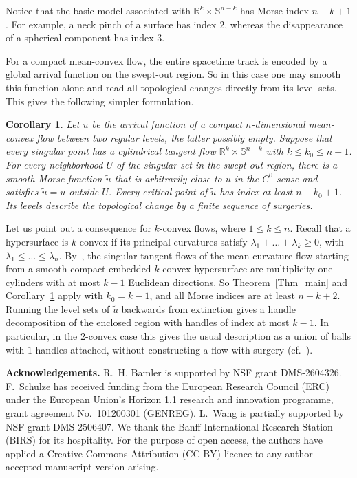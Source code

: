 \documentclass[10pt,a4paper]{amsart}
\newcommand{\IR}{\mathbb{R}}
\newcommand{\IS}{\mathbb{S}}
\newcommand{\la}{\lambda}
\newcommand{\td}[1]{\widetilde{#1}}
\newtheorem{Corollary}[equation]{Corollary}
\numberwithin{equation}{section}
\begin{document}
Notice that the basic model associated with $\IR^k\times\IS^{n-k}$ has Morse index $n-k+1$.
For example, a neck pinch of a surface has index $2$, whereas the disappearance of a spherical component has index $3$.

\medskip

For a compact mean-convex flow, the entire spacetime track is encoded by a global arrival function on the swept-out region.
So in this case one may smooth this function alone and read all topological changes directly from its level sets.
This gives the following simpler formulation.

\begin{Corollary}\label{Cor_mean_convex}
Let $u$ be the arrival function of a compact $n$-dimensional mean-convex flow between two regular levels, the latter possibly empty.
Suppose that every singular point has a cylindrical tangent flow $\IR^k\times\IS^{n-k}$ with $k\leq k_0\leq n-1$.
For every neighborhood $U$ of the singular set in the swept-out region, there is a smooth Morse function $\td u$ that is arbitrarily close to $u$ in the $C^0$-sense and satisfies $\td u=u$ outside $U$.
Every critical point of $\td u$ has index at least $n-k_0+1$.
Its levels describe the topological change by a finite sequence of surgeries.
\end{Corollary}


\medskip

Let us point out a consequence for $k$-convex flows, where $1\leq k\leq n$.
Recall that a hypersurface is $k$-convex if its principal curvatures satisfy $\la_1+\ldots+\la_k\geq0$, with $\la_1\leq\ldots\leq\la_n$.
By~\cite[Theorem~1.17]{CheegerHaslhoferNaber}, the singular tangent flows of the mean curvature flow starting from a smooth compact embedded $k$-convex hypersurface are multiplicity-one cylinders with at most $k-1$ Euclidean directions.
So Theorem~\ref{Thm_main} and Corollary~\ref{Cor_mean_convex} apply with $k_0=k-1$, and all Morse indices are at least $n-k+2$.
Running the level sets of $\td u$ backwards from extinction gives a handle decomposition of the enclosed region with handles of index at most $k-1$.
In particular, in the $2$-convex case this gives the usual description as a union of balls with $1$-handles attached, without constructing a flow with surgery (cf.~\cite{HuiskenSinestrari,BrendleHuisken,HaslhoferKleiner2}).

\medskip

\noindent\textbf{Acknowledgements.}
R.~H. Bamler is supported by NSF grant DMS-2604326.
F.~Schulze has received funding from the European Research Council (ERC) under the European Union's Horizon 1.1 research and innovation programme, grant agreement No.~101200301 (GENREG).
L.~Wang is partially supported by NSF grant DMS-2506407.
We thank the Banff International Research Station (BIRS) for its hospitality.
For the purpose of open access, the authors have applied a Creative Commons Attribution (CC BY) licence to any author accepted manuscript version arising.
\end{document}
